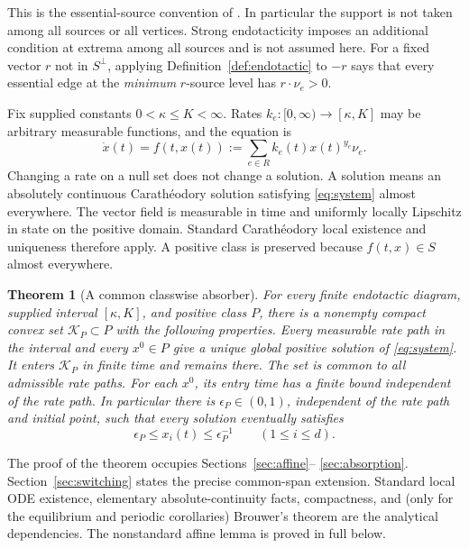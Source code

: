 \documentclass[11pt]{article}
\newtheorem{theorem}{Theorem}[section]
\theoremstyle{definition}
\theoremstyle{remark}
\numberwithin{equation}{section}
\begin{document}
This is the essential-source convention of
\cite[Definitions 3.9 and 3.14]{GMS2014}. In particular the support is
not taken among all sources or all vertices. Strong endotacticity
imposes an additional condition at extrema among all sources and is
not assumed here. For a fixed vector $r$ not in $S^\perp$, applying
Definition~\ref{def:endotactic} to $-r$ says that every essential edge
at the \emph{minimum} $r$-source level has $r\cdot\nu_e>0$.

Fix supplied constants $0<\kappa\leq K<\infty$. Rates
$k_e:[0,\infty)\to[\kappa,K]$ may be arbitrary measurable functions,
and the equation is
\begin{equation}
 \dot x(t)=f(t,x(t)):=\sum_{e\in R}k_e(t)x(t)^{y_e}\nu_e.
 \label{eq:system}
\end{equation}
Changing a rate on a null set does not change a solution. A solution
means an absolutely continuous Carath\'eodory solution satisfying
\eqref{eq:system} almost everywhere. The vector field is measurable
in time and uniformly locally Lipschitz in state on the positive
domain. Standard Carath\'eodory local existence and uniqueness
therefore apply. A positive class is preserved because
$f(t,x)\in S$ almost everywhere.

\begin{theorem}[A common classwise absorber]
\label{thm:main}
For every finite endotactic diagram, supplied interval $[\kappa,K]$,
and positive class $P$, there is a nonempty compact convex set
$\mathcal K_P\subset P$ with the following properties. Every
measurable rate path in the interval and every $x^0\in P$ give a
unique global positive solution of \eqref{eq:system}. It enters
$\mathcal K_P$ in finite time and remains there. The set is common
to all admissible rate paths. For each $x^0$, its entry time has a
finite bound independent of the rate path. In particular there is
$\epsilon_P\in(0,1)$, independent of the rate path and initial
point, such that every solution eventually satisfies
\[
 \epsilon_P\leq x_i(t)\leq\epsilon_P^{-1}\qquad(1\leq i\leq d).
\]
\end{theorem}

The proof of the theorem occupies Sections~\ref{sec:affine}--
\ref{sec:absorption}. Section~\ref{sec:switching} states the precise
common-span extension. Standard local ODE existence, elementary
absolute-continuity facts, compactness, and (only for the equilibrium
and periodic corollaries) Brouwer's theorem are the analytical
dependencies. The nonstandard affine lemma is proved in full below.
\end{document}
